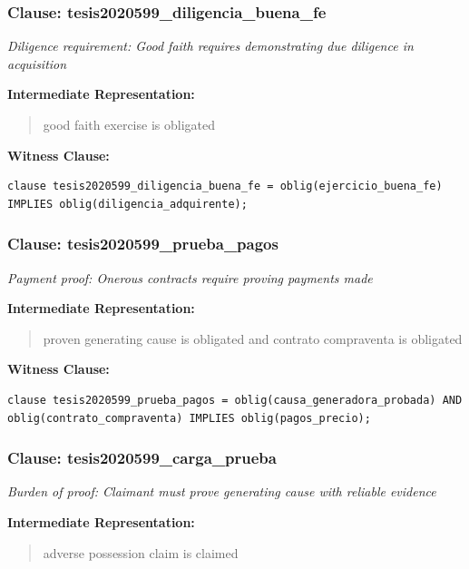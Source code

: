 \documentclass[11pt,a4paper]{article}
\begin{document}
\subsubsection{Clause: tesis2020599\_diligencia\_buena\_fe}

\textit{Diligence requirement: Good faith requires demonstrating due diligence in acquisition}

\textbf{Intermediate Representation:}

\begin{quote}
good faith exercise is obligated
\end{quote}

\textbf{Witness Clause:}

\begin{lstlisting}[style=witnessstyle, language=Witness]
clause tesis2020599_diligencia_buena_fe = oblig(ejercicio_buena_fe) IMPLIES oblig(diligencia_adquirente);
\end{lstlisting}

\subsubsection{Clause: tesis2020599\_prueba\_pagos}

\textit{Payment proof: Onerous contracts require proving payments made}

\textbf{Intermediate Representation:}

\begin{quote}
proven generating cause is obligated and contrato compraventa is obligated
\end{quote}

\textbf{Witness Clause:}

\begin{lstlisting}[style=witnessstyle, language=Witness]
clause tesis2020599_prueba_pagos = oblig(causa_generadora_probada) AND oblig(contrato_compraventa) IMPLIES oblig(pagos_precio);
\end{lstlisting}

\subsubsection{Clause: tesis2020599\_carga\_prueba}

\textit{Burden of proof: Claimant must prove generating cause with reliable evidence}

\textbf{Intermediate Representation:}

\begin{quote}
adverse possession claim is claimed
\end{quote}
\end{document}
